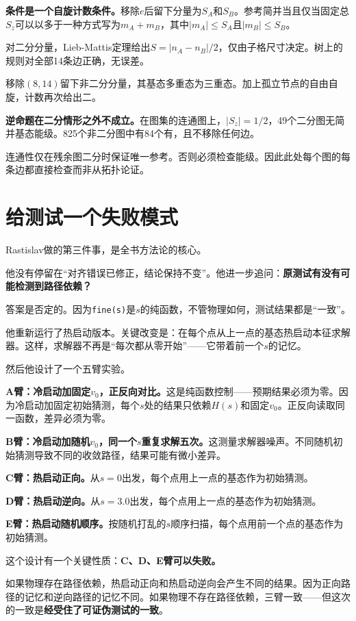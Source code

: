 \documentclass[11pt,a4paper]{book}
\theoremstyle{definition}
\begin{document}
\textbf{条件是一个自旋计数条件。}移除$e$后留下分量为$S_A$和$S_B$。参考简并当且仅当固定总$S_z$可以以多于一种方式写为$m_A+m_B$，其中$|m_A|\le S_A$且$|m_B|\le S_B$。

对二分分量，Lieb-Mattis定理给出$S=|n_A-n_B|/2$，仅由子格尺寸决定。树上的规则对全部14条边正确，无误差。

移除$(8,14)$留下非二分分量，其基态多重态为三重态。加上孤立节点的自由自旋，计数再次给出二。

\textbf{逆命题在二分情形之外不成立。}在图集的连通图上，$|S_z|=1/2$，49个二分图无简并基态能级。825个非二分图中有84个有，且不移除任何边。

连通性仅在残余图二分时保证唯一参考。否则必须检查能级。因此此处每个图的每条边都直接检查而非从拓扑论证。

\section{给测试一个失败模式}

Rastislav做的第三件事，是全书方法论的核心。

他没有停留在“对齐错误已修正，结论保持不变”。他进一步追问：\textbf{原测试有没有可能检测到路径依赖？}

答案是否定的。因为\texttt{fine(s)}是$s$的纯函数，不管物理如何，测试结果都是“一致”。

他重新运行了热启动版本。关键改变是：在每个点从上一点的基态热启动本征求解器。这样，求解器不再是“每次都从零开始”——它带着前一个$s$的记忆。

然后他设计了一个五臂实验。

\textbf{A臂：冷启动加固定$v_0$，正反向对比。}这是纯函数控制——预期结果必须为零。因为冷启动加固定初始猜测，每个$s$处的结果只依赖$H(s)$和固定$v_0$。正反向读取同一函数，差异必须为零。

\textbf{B臂：冷启动加随机$v_0$，同一个$s$重复求解五次。}这测量求解器噪声。不同随机初始猜测导致不同的收敛路径，结果可能有微小差异。

\textbf{C臂：热启动正向。}从$s=0$出发，每个点用上一点的基态作为初始猜测。

\textbf{D臂：热启动逆向。}从$s=3.0$出发，每个点用上一点的基态作为初始猜测。

\textbf{E臂：热启动随机顺序。}按随机打乱的$s$顺序扫描，每个点用前一个点的基态作为初始猜测。

这个设计有一个关键性质：\textbf{C、D、E臂可以失败。}

如果物理存在路径依赖，热启动正向和热启动逆向会产生不同的结果。因为正向路径的记忆和逆向路径的记忆不同。如果物理不存在路径依赖，三臂一致——但这次的一致是\textbf{经受住了可证伪测试的一致}。
\end{document}
